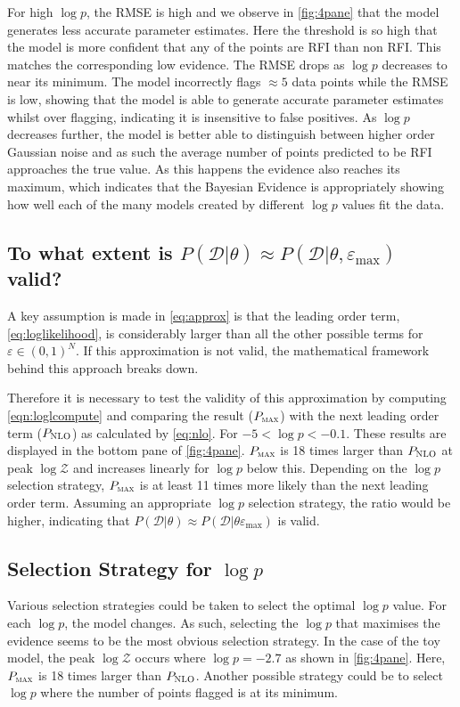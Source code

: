 \documentclass[fleqn,usenatbib]{mnras}
\begin{document}
For high $\log p$, the RMSE is high and we observe in \cref{fig:4pane} that the model generates less accurate parameter estimates. Here the threshold is so high that the model is more confident that any of the points are RFI than non RFI. This matches the corresponding low evidence. The RMSE drops as $\log p$ decreases to near its minimum. The model incorrectly flags $\approx 5$ data points while the RMSE is low, showing that the model is able to generate accurate parameter estimates whilst over flagging, indicating it is insensitive to false positives. As $\log p$ decreases further, the model is better able to distinguish between higher order Gaussian noise and as such the average number of points predicted to be RFI approaches the true value. As this happens the evidence also reaches its maximum, which indicates that the Bayesian Evidence is appropriately showing how well each of the many models created by different $\log p$ values fit the data.

\subsection{To what extent is $P(\mathcal{D}|\theta) \approx P(\mathcal{D}|\theta, \varepsilon_{\mathrm{max}})$ valid?}
A key assumption is made in \cref{eq:approx} is that the leading order term, \cref{eq:loglikelihood}, is considerably larger than all the other possible terms for $\varepsilon \in (0, 1)^N$. If this approximation is not valid, the mathematical framework behind this approach breaks down.

Therefore it is necessary to test the validity of this approximation by computing \cref{eqn:loglcompute} and comparing the result ($P_{\textsc{max}}$) with the next leading order term ($P_{\textsc{NLO}}$) as calculated by \cref{eq:nlo}. For $-5 < \log p < -0.1$. These results are displayed in the bottom pane of \cref{fig:4pane}. $P_{\textsc{max}}$ is 18 times larger than $P_{\textsc{NLO}}$ at peak $\log \mathcal{Z}$ and increases linearly for $\log p$ below this. Depending on the $\log p$ selection strategy, $P_{\textsc{max}}$ is at least 11 times more likely than the next leading order term. Assuming an appropriate $\log p$ selection strategy, the ratio would be higher, indicating that $P(\mathcal{D}|\theta) \approx P(\mathcal{D}|\theta \varepsilon_{\mathrm{max}})$ is valid.

\subsection{Selection Strategy for $\log p$}
Various selection strategies could be taken to select the optimal $\log p$ value. For each $\log p$, the model changes. As such, selecting the $\log p$ that maximises the evidence seems to be the most obvious selection strategy. In the case of the toy model, the peak $\log \mathcal{Z}$ occurs where $\log p = -2.7$ as shown in \cref{fig:4pane}. Here, $P_{\textsc{max}}$ is 18 times larger than $P_{\textsc{NLO}}$. Another possible strategy could be to select $\log p$ where the number of points flagged is at its minimum. 
\end{document}
